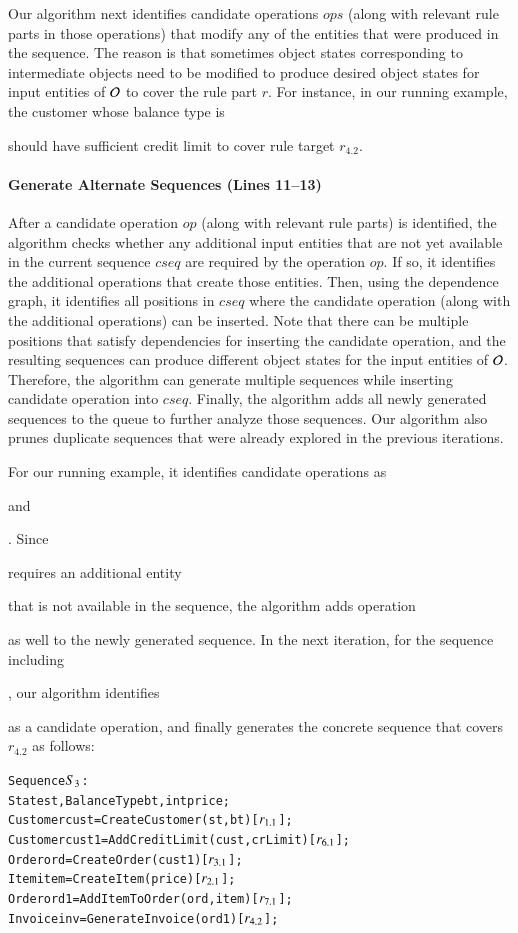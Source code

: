 Our algorithm next identifies candidate operations $ops$ (along with relevant
rule parts in those operations) that modify any of the entities
that were produced in the sequence. The reason is that sometimes object states 
corresponding to intermediate objects need to be modified to produce desired object states
for input entities of ${\cal O}$ to cover the rule part $r$. 
For instance, in our running example, the customer whose balance type
is \subject{Credit} should have sufficient credit limit to cover rule target $r_{4.2}$.

\vskip -7pt
\paragraph*{Generate Alternate Sequences (Lines 11--13)} After a candidate
operation $op$ (along with relevant rule parts) is identified, the algorithm checks
whether any additional input entities that are not yet available in the current
sequence $cseq$ are required by the operation $op$.  If so, it identifies the
additional operations that create those entities. Then, using the dependence
graph, it identifies all positions in $cseq$ where the candidate operation
(along with the additional operations) can be inserted. Note that there can be
multiple positions that satisfy dependencies for inserting the candidate
operation, and the resulting sequences can produce different object states for
the input entities of ${\cal O}$.  Therefore, the algorithm can generate
multiple sequences while inserting candidate operation into $cseq$. Finally, the
algorithm adds all newly generated sequences to the queue to further analyze
those sequences. Our algorithm also prunes duplicate sequences that were already
explored in the previous iterations.

For our running example, it identifies candidate operations as 
\subject{AddItemToOrder} and \subject{AddCreditLimit}. Since \subject{AddItemToOrder} requires an additional
entity \subject{Item} that is not available in the sequence, the algorithm adds
operation \subject{CreateItem} as well to the newly generated sequence. 
In the next iteration, for the sequence including \subject{AddCreditLimit},
our algorithm identifies \subject{AddItemToOrder} as a candidate operation, and 
finally generates the concrete sequence that covers $r_{4.2}$
as follows:

\vspace*{-4pt}
{\scriptsize
\begin{alltt}
 Sequence \(S\sb{3}\):
 State st, BalanceType bt, int price;
 Customer cust = CreateCustomer(st, bt) [\(r\sb{1.1}\)];
 Customer cust1 = AddCreditLimit(cust, crLimit) [\(r\sb{6.1}\)];
 Order ord = CreateOrder(cust1) [\(r\sb{3.1}\)];
 Item item = CreateItem(price) [\(r\sb{2.1}\)];
 Order ord1 = AddItemToOrder(ord, item) [\(r\sb{7.1}\)];
 Invoice inv = GenerateInvoice(ord1) [\(r\sb{4.2}\)];  
\end{alltt}
}
\vspace*{-5pt}


